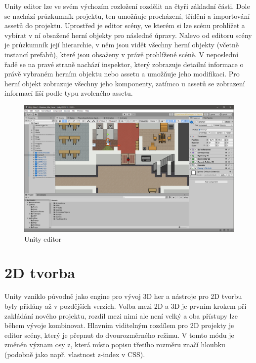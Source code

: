 \documentclass[FM,Proj]{tulthesis}
\begin{document}
	Unity editor lze ve svém výchozím rozložení rozdělit na čtyři základní části. Dole se nachází průzkumník projektu, ten umožňuje procházení, třídění a importování assetů do projektu. Uprostřed je editor scény, ve kterém si lze scénu prohlížet a vybírat v ní obsažené herní objekty pro následné úpravy. Nalevo od editoru scény je průzkumník její hierarchie, v něm jsou vidět všechny herní objekty (včetně instancí prefabů), které jsou obsaženy v právě prohlížené scéně. V neposlední řadě se na pravé straně nachází inspektor, který zobrazuje detailní informace o právě vybraném herním objektu nebo assetu a umožňuje jeho modifikaci. Pro herní objekt zobrazuje všechny jeho komponenty, zatímco u assetů se zobrazení informací liší podle typu zvoleného assetu.
	
	\begin{figure}[ht]
		\centering
		\includegraphics[width=\textwidth]{img/UnityEditor}
		\caption{Unity editor}
	\end{figure}
	
	\section{2D tvorba}
	
	Unity vzniklo původně jako engine pro vývoj 3D her a nástroje pro 2D tvorbu byly přidány až v pozdějších verzích. Volba mezi 2D a 3D je prvním krokem při zakládání nového projektu, rozdíl mezi nimi ale není velký a oba přístupy lze během vývoje kombinovat. Hlavním viditelným rozdílem pro 2D projekty je editor scény, který je přepnut do dvourozměrného režimu. V tomto módu je změněn význam osy z, která místo popisu třetího rozměru značí hloubku (podobně jako např. vlastnost z-index v CSS). \cite{Unity2DAnnouncement}
	
\end{document}
